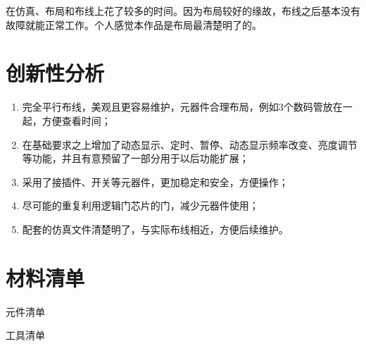 \documentclass{article}
\begin{document}
在仿真、布局和布线上花了较多的时间。因为布局较好的缘故，布线之后基本没有故障就能正常工作。个人感觉本作品是布局最清楚明了的。

\section{创新性分析}%
\label{sec:创新性分析}

\begin{enumerate}
	\item 完全平行布线，美观且更容易维护，元器件合理布局，例如3个数码管放在一起，方便查看时间；
	\item 在基础要求之上增加了动态显示、定时、暂停、动态显示频率改变、亮度调节等功能，并且有意预留了一部分用于以后功能扩展；
	\item 采用了接插件、开关等元器件，更加稳定和安全，方便操作；
	\item 尽可能的重复利用逻辑门芯片的门，减少元器件使用；
	\item 配套的仿真文件清楚明了，与实际布线相近，方便后续维护。
\end{enumerate}

\clearpage







\appendix

\section{材料清单}%
\label{sec:材料清单}

\begin{table}[htpb]
	\centering
	\caption{元件清单}
	\label{tab:元件清单}
\end{table}

\begin{table}[htpb]
	\centering
	\caption{工具清单}
	\label{tab:工具清单}
\end{table}
\end{document}
